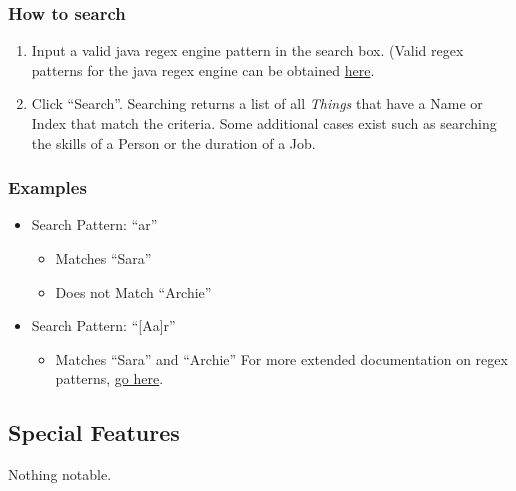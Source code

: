 \documentclass[english,floatsintext,man]{apa6}
\providecommand{\tightlist}{%
  \setlength{\itemsep}{0pt}\setlength{\parskip}{0pt}}
\begin{document}
\subsubsection{How to search}\label{how-to-search}

\begin{enumerate}
\def\labelenumi{\arabic{enumi}.}
\tightlist
\item
  Input a valid java regex engine pattern in the search box. (Valid
  regex patterns for the java regex engine can be obtained
  \href{http://docs.oracle.com/javase/8/docs/api/java/util/regex/Pattern.html}{here}.
\item
  Click \enquote{Search}. Searching returns a list of all \emph{Things}
  that have a Name or Index that match the criteria. Some additional
  cases exist such as searching the skills of a Person or the duration
  of a Job.
\end{enumerate}

\subsubsection{Examples}\label{examples}

\begin{itemize}
\tightlist
\item
  Search Pattern: \enquote{ar}

  \begin{itemize}
  \tightlist
  \item
    Matches \enquote{Sara}
  \item
    Does not Match \enquote{Archie}
  \end{itemize}
\item
  Search Pattern: \enquote{{[}A\textbar{}a{]}r}

  \begin{itemize}
  \tightlist
  \item
    Matches \enquote{Sara} and \enquote{Archie} For more extended
    documentation on regex patterns,
    \href{http://docs.oracle.com/javase/8/docs/api/java/util/regex/Pattern.html}{go
    here}.
  \end{itemize}
\end{itemize}

\subsection{Special Features}\label{special-features}

Nothing notable.
\end{document}
